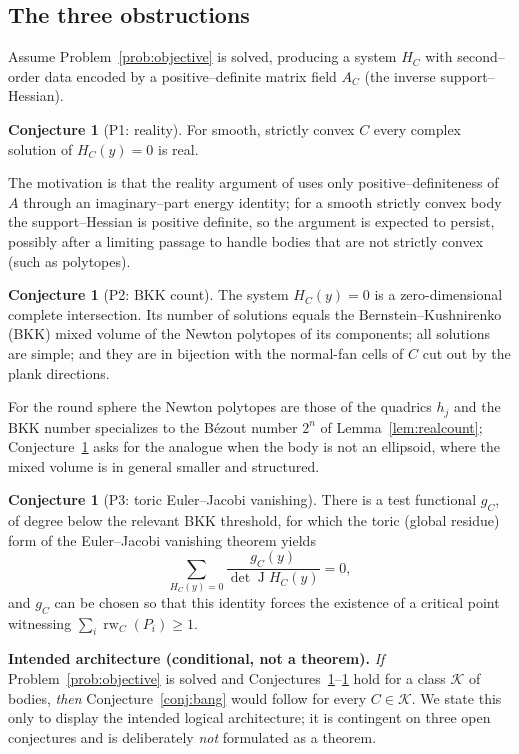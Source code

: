 \documentclass[11pt,reqno]{amsart}
\theoremstyle{plain}
\theoremstyle{definition}
\newtheorem{conjecture}[theorem]{Conjecture}
\newcommand{\relw}{\operatorname{rw}}
\newcommand{\Jac}{\operatorname{J}}
\begin{document}
\subsection{The three obstructions}
Assume Problem~\ref{prob:objective} is solved, producing a system $H_C$ with
second--order data encoded by a positive--definite matrix field $A_C$ (the inverse
support--Hessian).

\begin{conjecture}[P1: reality]\label{conj:reality}
For smooth, strictly convex $C$ every complex solution of $H_C(y)=0$ is real.
\end{conjecture}

The motivation is that the reality argument of
\cite[Lem.~3]{GalicerOrtegaPinasco2026} uses only positive--definiteness of $A$
through an imaginary--part energy identity; for a smooth strictly convex body the
support--Hessian is positive definite, so the argument is expected to persist,
possibly after a limiting passage to handle bodies that are not strictly convex
(such as polytopes).

\begin{conjecture}[P2: BKK count]\label{conj:count}
The system $H_C(y)=0$ is a zero-dimensional complete intersection. Its number of
solutions equals the Bernstein--Kushnirenko (BKK) mixed volume of the Newton
polytopes of its components; all solutions are simple; and they are in bijection
with the normal-fan cells of $C$ cut out by the plank directions.
\end{conjecture}

For the round sphere the Newton polytopes are those of the quadrics $h_j$ and the
BKK number specializes to the B\'ezout number $2^n$ of Lemma~\ref{lem:realcount};
Conjecture~\ref{conj:count} asks for the analogue when the body is not an
ellipsoid, where the mixed volume is in general smaller and structured.

\begin{conjecture}[P3: toric Euler--Jacobi vanishing]\label{conj:vanishing}
There is a test functional $g_C$, of degree below the relevant BKK threshold, for
which the toric (global residue) form of the Euler--Jacobi vanishing theorem
yields
\[
\sum_{H_C(y)=0}\frac{g_C(y)}{\det \Jac H_C(y)}=0,
\]
and $g_C$ can be chosen so that this identity forces the existence of a critical
point witnessing $\sum_i\relw_C(P_i)\ge 1$.
\end{conjecture}

\medskip
\noindent\textbf{Intended architecture (conditional, not a theorem).}
\emph{If} Problem~\ref{prob:objective} is solved and
Conjectures~\ref{conj:reality}--\ref{conj:vanishing} hold for a class
$\mathcal{K}$ of bodies, \emph{then} Conjecture~\ref{conj:bang} would follow for
every $C\in\mathcal{K}$. We state this only to display the intended logical
architecture; it is contingent on three open conjectures and is deliberately
\emph{not} formulated as a theorem.
\medskip
\end{document}
